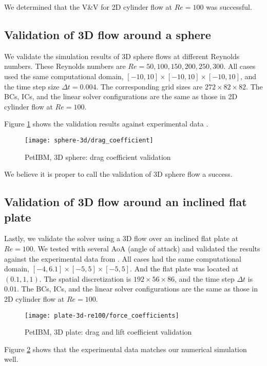 We determined that the V\&V for 2D cylinder flow at $Re=100$ was successful.

\subsection*{Validation of 3D flow around a sphere}

We validate the simulation results of 3D sphere flows at different Reynolds numbers.
These Reynolds numbers are $Re=50, 100, 150, 200, 250, 300$.
All cases used the same computational domain, $[-10, 10] \times [-10, 10] \times [-10, 10]$, and the time step size $\Delta t=0.004$.
The corresponding grid sizes are $272 \times 82 \times 82$.
The BCs, ICs, and the linear solver configurations are the same as those in 2D cylinder flow at $Re=100$.

Figure \ref{fig:petibm-sphere3d-drag-val} shows the validation results against experimental data \cite{clift_bubbles_2013,roos_experimental_1971}.
\begin{figure}[hbt!]
    \texttt{[image: sphere-3d/drag\_coefficient]}
    \caption[PetIBM, 3D sphere: drag coefficient validation]{
        PetIBM, 3D sphere: drag coefficient validation \cite{clift_bubbles_2013,roos_experimental_1971}
    }
    \label{fig:petibm-sphere3d-drag-val}
\end{figure}
We believe it is proper to call the validation of 3D sphere flow a success.

\subsection*{Validation of 3D flow around an inclined flat plate}

Lastly, we validate the solver using a 3D flow over an inclined flat plate at $Re=100$.
We tested with several AoA (angle of attack) and validated the results against the experimental data from \cite{taira_unsteadiness_2007}.
All cases had the same computational domain, $[-4, 6.1] \times [-5, 5] \times [-5, 5]$.
And the flat plate was located at $(0.1, 1, 1)$.
The spatial discretization is $192 \times 56 \times 86$, and the time step $\Delta t$ is $0.01$.
The BCs, ICs, and the linear solver configurations are the same as those in 2D cylinder flow at $Re=100$.

\begin{figure}[hbt!]
    \texttt{[image: plate-3d-re100/force\_coefficients]}
    \caption{PetIBM, 3D plate: drag and lift coefficient validation}
    \label{fig:petibm-plate3d-drag-lift-val}
\end{figure}
Figure \ref{fig:petibm-plate3d-drag-lift-val} shows that the experimental data matches our numerical simulation well.

